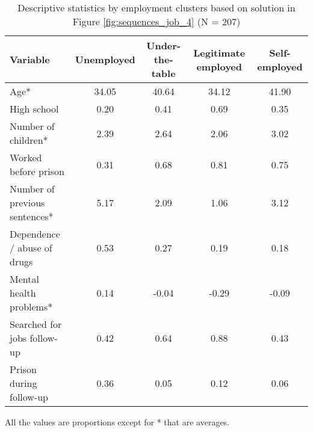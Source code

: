 \begin{table}[htp]
\footnotesize
\setlength{\tabcolsep}{10pt}
\renewcommand{\arraystretch}{1.3}
\begin{threeparttable}
\centering
\caption{Descriptive statistics by employment clusters \newline based on solution in Figure \ref{fig:sequences_job_4} (N = 207)} 
\label{tab:descriptives_job_4}
\begin{tabular}{lcccc}
  \hline
Variable & Unemployed & Under-the-table & Legitimate employed & Self-employed \\ 
  \hline
Age* & 34.05 & 40.64 & 34.12 & 41.90 \\ 
  High school & 0.20 & 0.41 & 0.69 & 0.35 \\ 
  Number of children* & 2.39 & 2.64 & 2.06 & 3.02 \\ 
  Worked before prison & 0.31 & 0.68 & 0.81 & 0.75 \\ 
  Number of previous sentences* & 5.17 & 2.09 & 1.06 & 3.12 \\ 
  Dependence / abuse of drugs & 0.53 & 0.27 & 0.19 & 0.18 \\ 
  Mental health problems* & 0.14 & -0.04 & -0.29 & -0.09 \\ 
  Searched for jobs follow-up & 0.42 & 0.64 & 0.88 & 0.43 \\ 
  Prison during follow-up & 0.36 & 0.05 & 0.12 & 0.06 \\ 
   \hline
\end{tabular}
\begin{tablenotes}
\scriptsize
\item All the values are proportions except for * that are averages.
\end{tablenotes}
\end{threeparttable}
\end{table}
